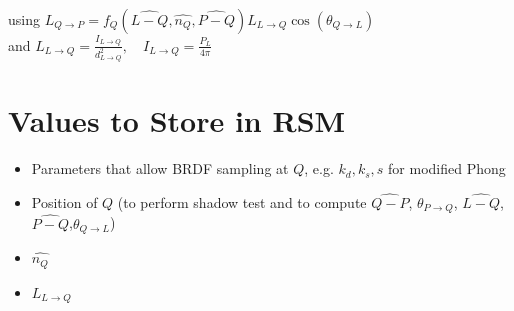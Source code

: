 \documentclass[a4paper,11pt,final]{article}
\begin{document}
\noindent
using
$L_{Q\rightarrow P} = f_Q(\widehat{L-Q}, \widehat{n_Q}, \widehat{P-Q}) L_{L\rightarrow Q} \cos(\theta_{Q\rightarrow L})$\\
and
$L_{L\rightarrow Q} = \frac{I_{L\rightarrow Q}}{d^2_{L\rightarrow Q}}, \quad I_{L\rightarrow Q} = \frac{P_L}{4\pi}$


\section{Values to Store in RSM}

\begin{itemize}
\item Parameters that allow BRDF sampling at $Q$, e.g. $k_d, k_s, s$ for modified Phong
\item Position of $Q$ (to perform shadow test and to compute $\widehat{Q-P}$,
$\theta_{P\rightarrow Q}$, $\widehat{L-Q}$, $\widehat{P-Q}$,$ \theta_{Q\rightarrow L}$)
\item $\widehat{n_Q}$
\item $L_{L\rightarrow Q}$
\end{itemize}

%
\end{document}
